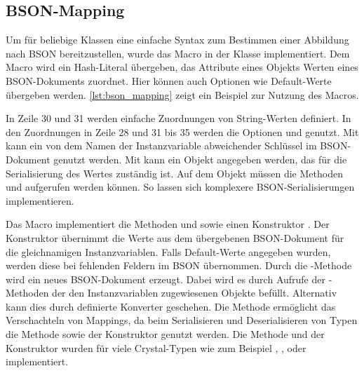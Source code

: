 \subsection{BSON-Mapping}
\label{ssec:bm_bson_mapping}

Um für beliebige Klassen eine einfache Syntax zum Bestimmen einer Abbildung
nach BSON bereitzustellen, wurde das Macro  in der Klasse
 implementiert.  Dem Macro wird ein Hash-Literal übergeben, das
Attribute eines Objekts Werten eines BSON-Dokuments zuordnet.  Hier können
auch Optionen wie Default-Werte übergeben werden.  \cref{lst:bson_mapping} zeigt
ein Beispiel zur Nutzung des Macros.



In Zeile 30 und 31 werden einfache Zuordnungen von String-Werten definiert.  In
den Zuordnungen in Zeile 28 und 31 bis 35 werden die Optionen  und
 genutzt.  Mit  kann ein von dem Namen der
Instanzvariable abweichender Schlüssel im BSON-Dokument genutzt werden.  Mit
 kann ein Objekt angegeben werden, das für die Serialisierung
des Wertes zuständig ist.  Auf dem Objekt müssen die Methoden
 und  aufgerufen
werden können.  So lassen sich komplexere BSON-Serialisierungen implementieren.

Das Macro implementiert die Methoden  und
 sowie einen Konstruktor .  Der
Konstruktor übernimmt die Werte aus dem übergebenen BSON-Dokument für die
gleichnamigen Instanzvariablen.  Falls Default-Werte angegeben wurden, werden
diese bei fehlenden Feldern im BSON übernommen.  Durch die
-Methode wird ein neues BSON-Dokument erzeugt.  Dabei wird es
durch Aufrufe der -Methoden der den Instanzvariablen
zugewiesenen Objekte befüllt.  Alternativ kann dies durch definierte Konverter
geschehen.  Die Methode  ermöglicht das Verschachteln
von Mappings, da beim Serialisieren und Deserialisieren von Typen die Methode
 sowie der Konstruktor  genutzt
werden.  Die Methode und der Konstruktor wurden für viele Crystal-Typen wie zum
Beispiel , ,  oder 
implementiert.
